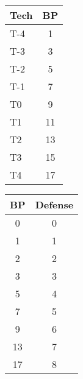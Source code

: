 
\begin{table*}[ht]\centering
%
\begin{minipage}{0.45\textwidth}\centering
\begin{tabular}{lc}\toprule
Tech	& BP \\\midrule
T-4	& 1 \\
T-3	& 3 \\
T-2	& 5 \\
T-1	& 7 \\
T0	& 9 \\
T1	& 11 \\
T2	& 13 \\
T3	& 15 \\
T4	& 17 \\\bottomrule
\end{tabular}
\caption{Personal armour build points per tech level}
\label{tab:armour-build}
\end{minipage}
%
\hspace*{\fill}
%
\begin{minipage}{0.45\textwidth}\centering
\begin{tabular}{cc}\toprule
BP	& Defense \\\midrule
0	& 0 \\
1	& 1 \\
2	& 2 \\
3	& 3 \\
5	& 4 \\
7	& 5 \\
9	& 6 \\
13	& 7 \\
17	& 8 \\\bottomrule
\end{tabular}
\caption{Personal armour defense build costs}
\label{tab:armour-defense-costs}
\end{minipage}
%
\end{table*}
